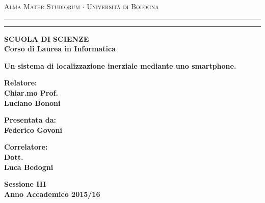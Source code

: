 \documentclass[12pt,a4paper,openright,twoside]{report}
\begin{document}
\begin{titlepage}
\begin{center}
{{\Large{\textsc{Alma Mater Studiorum $\cdot$ Universit\`a di
Bologna}}}} \rule[0.1cm]{15.8cm}{0.1mm}
\rule[0.5cm]{15.8cm}{0.6mm}
{\small{\bf SCUOLA DI SCIENZE\\
Corso di Laurea in Informatica }}
\end{center}
\vspace{15mm}
\begin{center}
{\LARGE{\bf Un sistema di localizzazione inerziale mediante uno smartphone.}}\\
\end{center}
\vspace{40mm}
\par
\noindent
\begin{minipage}[t]{0.47\textwidth}
{\large{\bf Relatore:\\
Chiar.mo Prof.\\
Luciano Bononi}}
\end{minipage}
\hfill
\begin{minipage}[t]{0.47\textwidth}\raggedleft
{\large{\bf Presentata da:\\
Federico Govoni}}
\end{minipage}
\vspace{8mm}
\par
\noindent
\begin{minipage}[t]{0.47\textwidth}
{\large{\bf Correlatore:\\
Dott.\\
Luca Bedogni}}
\end{minipage}
\vspace{20mm}
\begin{center}
{\large{\bf Sessione III\\%
Anno Accademico 2015/16}}%
\end{center}
\end{titlepage}
\clearpage{\pagestyle{empty}\cleardoublepage}%



\begin{titlepage}                       %
%
\thispagestyle{empty}                   %
\topmargin=6.5cm                        %
\raggedleft                             %
\large                                  %
\newpage                                %
%
\clearpage{\pagestyle{empty}\cleardoublepage}%
\end{titlepage}
\end{document}
